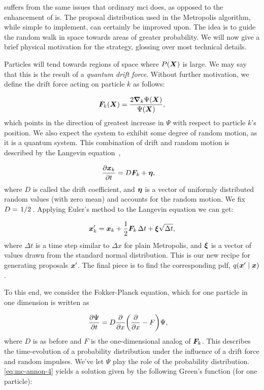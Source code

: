 \documentclass[Thesis.tex]{subfiles}
\begin{document}
 suffers from the same issues that ordinary \gls{mci}
does, as opposed to the enhancement of \gls{is}. The proposal
distribution used in the Metropolis algorithm, while simple to implement, can
certainly be improved upon. The idea is to guide the random walk in space
towards areas of greater probability. We will now give a brief physical
motivation for the strategy, glossing over most technical details.

Particles will tend towards regions of space where $P(\bm{X})$ is large. We may say
that this is the result of a \emph{quantum drift force}. Without further
motivation, we define the drift force acting on particle $k$ as follows:

\begin{align}
  \bm{F}_k(\bm{X}) = \frac{2\grad_k{\Psi(\bm{X})}}{\Psi(\bm{X})},
\end{align}
which points in the direction of greatest increase in $\Psi$ with respect to
particle $k$'s position. We also expect the
system to exhibit some degree of random motion, as it is a quantum system. This
combination of drift and random motion is described by the Langevin equation~\cite{Langevin-1908}, %

\begin{align}
 \pdv{\bm{x}_k}{t} &= D\bm{F}_k + \bm{\eta},
\end{align}
where $D$ is called the drift coefficient, and $\bm{\eta}$ is a vector of
uniformly distributed random values (with zero mean) and accounts for the random
motion. We fix $D=\flatfrac{1}{2}$. Applying Euler's method to the Langevin
equation we can get:

\begin{align}
  \bm{x}_k' = \bm{x}_k + \frac{1}{2}\bm{F}_k\,\Delta t + \bm{\xi}\sqrt{\Delta t},
\end{align}
where $\Delta t$ is a time step similar to $\Delta x$ for plain Metropolis, and
$\bm{\xi}$ is a vector of values drawn from the standard normal distribution.
This is our new recipe for generating proposals $\bm{x}'$. The final piece is
to find the corresponding \gls{pdf},
$q\qty(\bm{x}'\;\middle|\;\bm{x})$.

To this end, we consider the Fokker-Planck equation, which for one particle in
one dimension is written as

\begin{align}
  \label{eq:mc-annon-4}
  \pdv{\Psi}{t} &= D\pdv{}{x}\qty(\pdv{}{x} - F)\Psi,
\end{align}
where $D$ is as before and $F$ is the one-dimensional analog of $\bm{F}_k$. This
describes the time-evolution of a probability distribution under the influence
of a drift force and random impulses. We've let $\Psi$ play the role of the
probability distribution. \cref{eq:mc-annon-4} yields a solution given by the
following Green's function (for one particle):
\end{document}
